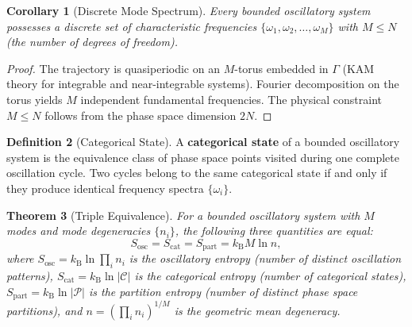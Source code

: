 \documentclass[11pt,twocolumn,a4paper]{article}
\newtheorem{theorem}{Theorem}[section]
\newtheorem{corollary}[theorem]{Corollary}
\theoremstyle{definition}
\newtheorem{definition}[theorem]{Definition}
\theoremstyle{remark}
\newcommand{\kB}{k_{\mathrm{B}}}
\newcommand{\Partition}{\mathcal{P}}
\newcommand{\Cat}{\mathcal{C}}
\begin{document}
\begin{corollary}[Discrete Mode Spectrum]
\label{cor:modes}
Every bounded oscillatory system possesses a discrete set of characteristic frequencies $\{\omega_1, \omega_2, \ldots, \omega_M\}$ with $M \leq N$ (the number of degrees of freedom).
\end{corollary}

\begin{proof}
The trajectory is quasiperiodic on an $M$-torus embedded in $\Gamma$ (KAM theory for integrable and near-integrable systems). Fourier decomposition on the torus yields $M$ independent fundamental frequencies. The physical constraint $M \leq N$ follows from the phase space dimension $2N$.
\end{proof}

\begin{definition}[Categorical State]
\label{def:catstate}
A \textbf{categorical state} of a bounded oscillatory system is the equivalence class of phase space points visited during one complete oscillation cycle. Two cycles belong to the same categorical state if and only if they produce identical frequency spectra $\{\omega_i\}$.
\end{definition}

\begin{theorem}[Triple Equivalence]
\label{thm:triple}
For a bounded oscillatory system with $M$ modes and mode degeneracies $\{n_i\}$, the following three quantities are equal:
\begin{equation}
S_{\mathrm{osc}} = S_{\mathrm{cat}} = S_{\mathrm{part}} = \kB M \ln n,
\end{equation}
where $S_{\mathrm{osc}} = \kB \ln \prod_i n_i$ is the oscillatory entropy (number of distinct oscillation patterns), $S_{\mathrm{cat}} = \kB \ln |\Cat|$ is the categorical entropy (number of categorical states), $S_{\mathrm{part}} = \kB \ln |\Partition|$ is the partition entropy (number of distinct phase space partitions), and $n = (\prod_i n_i)^{1/M}$ is the geometric mean degeneracy.
\end{theorem}
\end{document}
